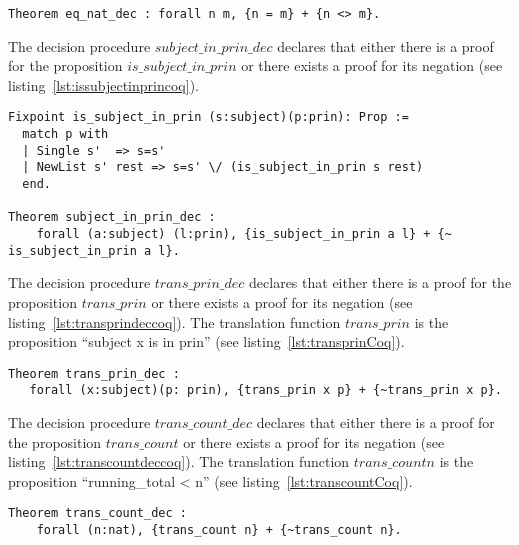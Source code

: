 \begin{lstlisting}
Theorem eq_nat_dec : forall n m, {n = m} + {n <> m}.
\end{lstlisting}

The decision procedure $subject\_in\_prin\_dec$ declares that either there is a proof for the proposition $is\_subject\_in\_prin$ or there exists a proof for its negation (see listing~\ref{lst:issubjectinprincoq}). 

\begin{lstlisting}
Fixpoint is_subject_in_prin (s:subject)(p:prin): Prop :=
  match p with
  | Single s'  => s=s'
  | NewList s' rest => s=s' \/ (is_subject_in_prin s rest)
  end.

Theorem subject_in_prin_dec :
    forall (a:subject) (l:prin), {is_subject_in_prin a l} + {~ is_subject_in_prin a l}.

\end{lstlisting}

The decision procedure $trans\_prin\_dec$ declares that either there is a proof for the proposition $trans\_prin$ or there exists a proof for its negation (see listing~\ref{lst:transprindeccoq}). The translation function $trans\_prin$ is the proposition ``subject x is in prin'' (see listing~\ref{lst:transprinCoq}).

\begin{minipage}[c]{0.95\textwidth}
\begin{lstlisting}
Theorem trans_prin_dec :
   forall (x:subject)(p: prin), {trans_prin x p} + {~trans_prin x p}.
\end{lstlisting}
\end{minipage}

The decision procedure $trans\_count\_dec$ declares that either there is a proof for the proposition $trans\_count$ or there exists a proof for its negation (see listing~\ref{lst:transcountdeccoq}). The translation function $trans\_count n$ is the proposition ``running\_total < n'' (see listing~\ref{lst:transcountCoq}).

\begin{lstlisting}
Theorem trans_count_dec :
    forall (n:nat), {trans_count n} + {~trans_count n}.
\end{lstlisting}

